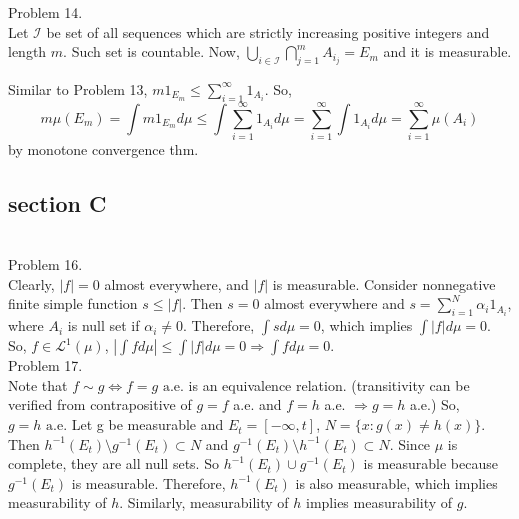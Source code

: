Problem 14. \\

Let $\mathcal{I}$ be set of all sequences which are strictly increasing positive integers and length $m$.
Such set is countable. Now, $\bigcup_{i \in \mathcal{I}} \bigcap_{j=1}^m A_{i_j} = E_m$ and it is measurable.

Similar to Problem 13, $m 1_{E_m} \leq \sum_{i=1}^{\infty}1_{A_i}$.
So, $$m \mu(E_m) = \int m 1_{E_m} d\mu \leq \int \sum_{i=1}^{\infty}1_{A_i} d\mu = \sum_{i=1}^{\infty} \int 1_{A_i} d\mu = \sum_{i=1}^{\infty}\mu(A_i)$$ by monotone convergence thm.

\subsection*{section C} \hfill \\

Problem 16. \\

Clearly, $ \lvert f \rvert = 0$ almost everywhere, and $\lvert f \rvert$ is measurable.
Consider nonnegative finite simple function $s \leq \lvert f \rvert$. Then $s=0$ almost everywhere
and $s = \sum_{i=1}^N \alpha_i 1_{A_i}$, where $A_i$ is null set if $\alpha_i \ne 0$.
Therefore, $\int s d\mu = 0$, which implies $\int \lvert f \rvert d\mu = 0$.
So, $f \in \mathcal{L}^1(\mu)$, $\left | \int f d \mu \right | \leq \int \lvert f \rvert d\mu =0 \Rightarrow \int f d \mu = 0$.\\

Problem 17. \\

Note that $f \sim g \Leftrightarrow f = g\text{ a.e.}$ is an equivalence relation. (transitivity can be verified from contrapositive of $g = f$ a.e. and $f = h$ a.e. $\Rightarrow g = h$ a.e.)
So, $g = h \text{ a.e}$.
Let g be measurable and $E_t = \left [ -\infty, t \right]$, $N = \{ x : g(x) \ne h(x)\}$.
Then $h^{-1}(E_t) \setminus g^{-1}(E_t) \subset N$ and $g^{-1}(E_t) \setminus h^{-1}(E_t) \subset N$.
Since $\mu$ is complete, they are all null sets. So $h^{-1}(E_t) \cup g^{-1}(E_t)$ is measurable because $g^{-1}(E_t)$ is measurable.
Therefore, $h^{-1}(E_t)$ is also measurable, which implies measurability of $h$.
Similarly, measurability of $h$ implies measurability of $g$. \\
